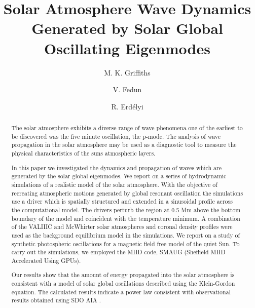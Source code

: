 \documentclass[authoryear,final,1p]{elsarticle}
\begin{document}
\title{Solar Atmosphere Wave Dynamics Generated by Solar Global  Oscillating Eigenmodes}
\author[swat, cics]{M. K. Griffiths }
\author[acse]{V. Fedun}
\author[swat]{R. Erd\'{e}lyi}
\address[swat]{Solar Physics and Space Plasma Research Centre ($SP^{2}RC$), School of Mathematics and 
Statistics, University of Sheffield, Hicks Building, Hounsfield Road, S7 3RH, UK}
\address[cics]{Corporate Information and Computing Services, The University of Sheffield, 10-12 Brunswick Street, Sheffield, S10 2FN, UK}
\address[acse]{Department of Automatic Control and Systems Engineering, The University of Sheffield, Mappin Street, Sheffield, S1 3JD, UK}

\begin{abstract}
The solar atmosphere exhibits a diverse range of wave phenomena one of the earliest to be discovered was the five minute 
oscillation, the p-mode.  The analysis of wave propagation in the solar atmosphere may be used as a diagnostic tool to 
measure the physical characteristics of the  suns atmospheric layers. 

In this paper we investigated the dynamics and propagation of waves which are generated by the solar global eigenmodes.  
We report on a series of hydrodynamic simulations of a realistic model of the solar atmosphere. With the objective of 
recreating atmospheric motions generated by global resonant oscillation the simulations use a driver which is spatially structured 
and extended in a sinusoidal profile across the computational model. The drivers perturb the region at 0.5 Mm above the bottom 
boundary of the model and coincident with the temperature minimum. A combination of the VALIIIC and McWhirter solar 
atmospheres and coronal density profiles were used as the background equilibrium model in the simulations. We report on 
a study of synthetic photospheric oscillations for a magnetic field free model of the quiet Sun. To carry out the simulations, 
we employed the MHD code, SMAUG (Sheffield MHD Accelerated Using GPUs). 

Our results show that the amount of energy propagated into the solar atmosphere is consistent with a model of solar 
global oscillations described using the Klein-Gordon equation. The calculated results indicate a power law consistent 
with observational results obtained using  SDO AIA  \citet{Ireland2015}. 
\end{abstract}
\end{document}
